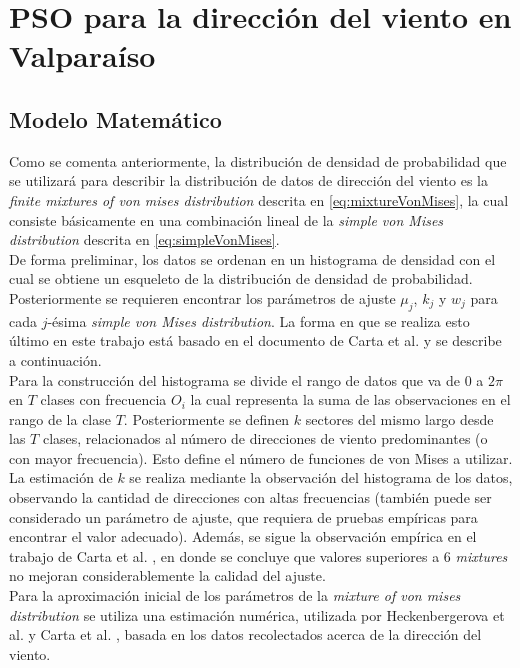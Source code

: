 
\chapter{PSO para la dirección del viento en Valparaíso}
\section{Modelo Matemático}\label{ss:model_math_dir} 
Como se comenta anteriormente, la distribución de densidad de probabilidad que se utilizará para describir la distribución de datos de dirección del viento
es la \emph{finite mixtures of von mises distribution} descrita en \ref{eq:mixtureVonMises}, la cual consiste básicamente en una combinación lineal de la \emph{simple von Mises distribution} descrita en \ref{eq:simpleVonMises}.\\ 
De forma preliminar, los datos se ordenan en un histograma de densidad con el cual se obtiene un esqueleto de la distribución de densidad de probabilidad. Posteriormente se requieren encontrar los parámetros de ajuste $\mu_j$, $k_j$ y $w_j$ para cada $j$-ésima \emph{simple von Mises distribution}. La forma en que
se realiza esto último en este trabajo está basado en el documento de Carta et al. \cite{Carta07} y se describe a continuación.\\
Para la construcción del histograma se divide el rango de datos que va de 0 a $2\pi$ en $T$ clases con frecuencia $O_i$ la cual representa la suma de las observaciones en el rango de la clase $T$. Posteriormente se definen $k$ sectores del mismo largo desde las $T$ clases, relacionados al número de direcciones de viento predominantes (o con mayor frecuencia). Esto define el número de funciones de von Mises a utilizar. La estimación de $k$ se realiza mediante la observación del histograma de los datos, observando la cantidad de direcciones con altas frecuencias (también puede ser considerado un parámetro de ajuste, que requiera de pruebas empíricas para encontrar el valor adecuado). Además, se sigue la observación empírica en el trabajo de Carta et al. \cite{Carta07}, en donde se concluye que valores superiores a 6 \emph{mixtures} no mejoran considerablemente la calidad del ajuste.\\
Para la aproximación inicial de los parámetros de la \emph{mixture of von mises distribution} se utiliza una estimación numérica, utilizada por Heckenbergerova et al. \cite{Heckenbergerova15} \cite{Heckenbergerova13} y Carta et al. \cite{Carta07}, basada en los datos recolectados acerca de la dirección del viento.\\
